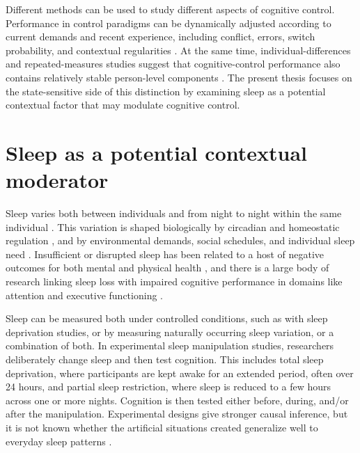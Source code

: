 \documentclass[12pt,a4paper]{report}
\begin{document}
Different methods can be used to study different aspects of cognitive control. Performance in control paradigms can be dynamically adjusted according to current demands and recent experience, including conflict, errors, switch probability, and contextual regularities \parencite{egner2023principles,bejjani2022latentswitch,cavanagh2014theta}. At the same time, individual-differences and repeated-measures studies suggest that cognitive-control performance also contains relatively stable person-level components \parencite{friedman2017unity,friedman2011genetic,fassbender2023lst}. The present thesis focuses on the state-sensitive side of this distinction by examining sleep as a potential contextual factor that may modulate cognitive control.


\section{Sleep as a potential contextual moderator}

Sleep varies both between individuals and from night to night within the same individual \parencite{bei2016sleepvariability}. This variation is shaped biologically by circadian and homeostatic regulation \parencite{foster2020sleep}, and by environmental demands, social schedules, and individual sleep need \parencite{fjell2024sleep}. Insufficient or disrupted sleep has been related to a host of negative outcomes for both mental and physical health \parencite{foster2020sleep}, and there is a large body of research linking sleep loss with impaired cognitive performance in domains like attention and executive functioning \parencite{lim2010meta, lowe2017meta, sen2023sleepef, tai2022sleepef, slama2018sleepswitching, wilckens2020sleepmddswitch, wilckens2014sleeppreparation, fjell2024sleep, kusztor2019differentialsleep, wilckens2016sleepcognitionage, basner2013sleepcognition, couyoumdjian2010switchingsleep}. 

Sleep can be measured both under controlled conditions, such as with sleep deprivation studies, or by measuring naturally occurring sleep variation, or a combination of both. In experimental sleep manipulation studies, researchers deliberately change sleep and then test cognition. This includes total sleep deprivation, where participants are kept awake for an extended period, often over 24 hours, and partial sleep restriction, where sleep is reduced to a few hours across one or more nights. Cognition is then tested either before, during, and/or after the manipulation. Experimental designs give stronger causal inference, but it is not known whether the artificial situations created generalize well to everyday sleep patterns \parencite{sen2023sleepef, fjell2024sleep}. 
\end{document}
